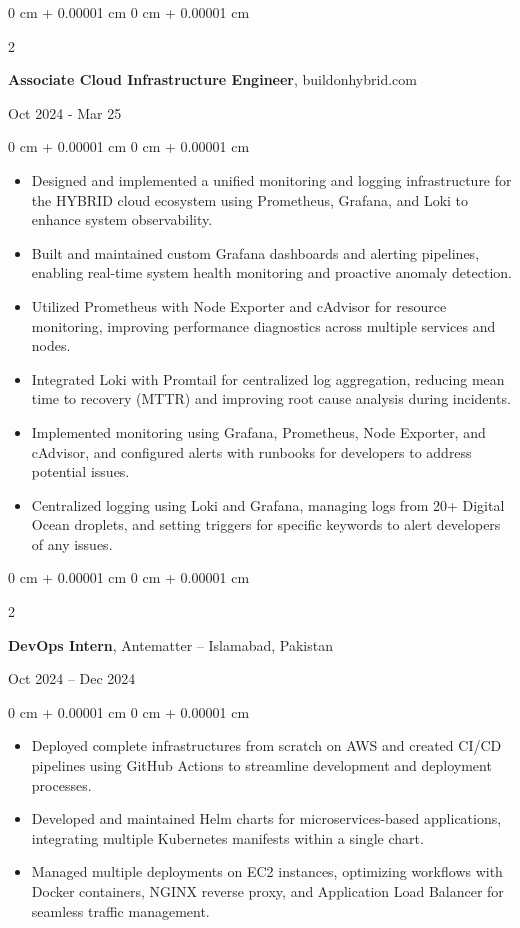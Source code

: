 \documentclass[10pt, letterpaper]{article}
\newenvironment{highlights}{
    \begin{itemize}[
        topsep=0.10 cm,
        parsep=0.10 cm,
        partopsep=0pt,
        itemsep=0pt,
        leftmargin=0 cm + 10pt
    ]
}{
    \end{itemize}
}
\newenvironment{onecolentry}{
    \begin{adjustwidth}{
        0 cm + 0.00001 cm
    }{
        0 cm + 0.00001 cm
    }
}{
    \end{adjustwidth}
}
\newenvironment{twocolentry}[2][]{
    \onecolentry
    \def\secondColumn{#2}
    \setcolumnwidth{\fill, 4.5 cm}
    \begin{paracol}{2}
}{
    \switchcolumn \raggedleft \secondColumn
    \end{paracol}
    \endonecolentry
}
\begin{document}
\vspace{0.10 cm}

\begin{twocolentry}{Oct 2024 - Mar 25}
    \textbf{Associate Cloud Infrastructure Engineer}, buildonhybrid.com
\end{twocolentry}
\vspace{0.10 cm}
\begin{onecolentry}
    \begin{highlights}
        \item Designed and implemented a unified monitoring and logging infrastructure for the HYBRID cloud ecosystem using Prometheus, Grafana, and Loki to enhance system observability.
        \item Built and maintained custom Grafana dashboards and alerting pipelines, enabling real-time system health monitoring and proactive anomaly detection.
        \item Utilized Prometheus with Node Exporter and cAdvisor for resource monitoring, improving performance diagnostics across multiple services and nodes.
        \item Integrated Loki with Promtail for centralized log aggregation, reducing mean time to recovery (MTTR) and improving root cause analysis during incidents.
        \item Implemented monitoring using Grafana, Prometheus, Node Exporter, and cAdvisor, and configured alerts with runbooks for developers to address potential issues.
        \item Centralized logging using Loki and Grafana, managing logs from 20+ Digital Ocean droplets, and setting triggers for specific keywords to alert developers of any issues.
    \end{highlights}
\end{onecolentry}

\vspace{0.10 cm}

\begin{twocolentry}{Oct 2024 – Dec 2024}
    \textbf{DevOps Intern}, Antematter – Islamabad, Pakistan
\end{twocolentry}
\vspace{0.10 cm}
\begin{onecolentry}
    \begin{highlights}
        \item Deployed complete infrastructures from scratch on AWS and created CI/CD pipelines using GitHub Actions to streamline development and deployment processes.
        \item Developed and maintained Helm charts for microservices-based applications, integrating multiple Kubernetes manifests within a single chart.
        \item Managed multiple deployments on EC2 instances, optimizing workflows with Docker containers, NGINX reverse proxy, and Application Load Balancer for seamless traffic management.
    \end{highlights}
\end{onecolentry}
\end{document}
